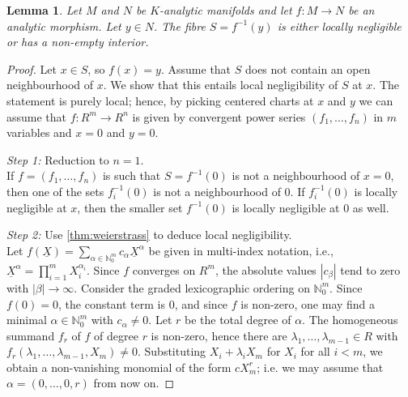 \documentclass[a4paper,10pt]{amsart}
\theoremstyle{plain}
\newtheorem{lemma}[thm]{Lemma}
\theoremstyle{definition}
\newcommand{\bbN}{\mathbb{N}}
\numberwithin{equation}{section}
\begin{document}
\begin{lemma}\label{lem:analyticMaps}
Let $M$ and $N$ be $K$-analytic manifolds and let $f \colon M \to N$ be an analytic morphism. Let $y \in N$.
The fibre $S = f^{-1}(y)$ 
is either locally negligible or has a non-empty interior.
\end{lemma}
\begin{proof}
Let $x \in S$, so $f(x) = y$. Assume that $S$ does not contain an open neighbourhood of $x$. We show that this entails local negligibility of $S$ at $x$. The statement is purely local; hence, by picking centered charts at $x$ and $y$ we can assume that $f \colon R^m \to R^n$ is given by convergent power series $(f_1,\dots,f_n)$ in $m$ variables and $x=0$ and $y=0$.

\medskip

\emph{Step 1:} Reduction to $n=1$.\\ 
If $f=(f_1,\dots,f_n)$ is such that $S = f^{-1}(0)$ is not a neighbourhood of  $x=0$, then one of the sets $f_i^{-1}(0)$ is not a neighbourhood of $0$. If $f_i^{-1}(0)$ is locally negligible at $x$, then the smaller set $f^{-1}(0)$ is locally negligible at $0$ as well.

\medskip

\emph{Step 2:} Use \cref{thm:weierstrass} to deduce local negligibility. \\
Let $f(\underline{X})=\sum_{\alpha \in \bbN_0^m} c_\alpha \underline{X}^\alpha$ be given in multi-index notation, i.e., $\underline{X}^\alpha= \prod_{i=1}^m X_i^{\alpha_i}$. Since $f$ converges on $R^m$, the absolute values $|c_\beta|$ tend to zero with $|\beta| \to \infty$.
Consider the graded lexicographic ordering on $\bbN_0^m$.
Since $f(0) = 0$, the constant term is 0, and since $f$ is non-zero, one may find
a minimal $\alpha \in \bbN_0^m$ with $c_\alpha \neq 0$. 
Let $r$ be the total degree of $\alpha$.
The homogeneous summand $f_{r}$ of $f$ of degree $r$ is non-zero, hence there are $\lambda_1,\dots,\lambda_{m-1} \in R$ with $f_{r}(\lambda_1,\dots,\lambda_{m-1},X_m) \neq 0$. 
Substituting $X_i+\lambda_i X_m$ for $X_i$ for all $i < m$, we obtain a non-vanishing monomial of the form $cX_m^{r}$; i.e. we may assume that $\alpha=(0,\dots,0,r)$ from now on.


\end{proof}
\end{document}
